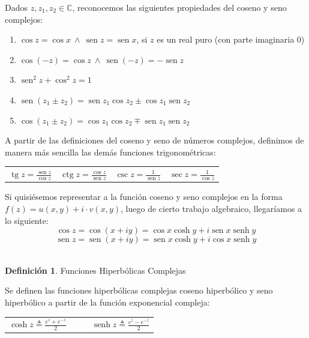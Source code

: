 \documentclass[12pt]{article}
\theoremstyle{definition}
\newtheorem{definition}{Definici\'on}[section]
\theoremstyle{theorem}
\DeclareMathOperator{\sen}{sen}
\DeclareMathOperator{\senh}{senh}
\DeclareMathOperator{\tg}{tg}
\DeclareMathOperator{\ctg}{ctg}
\begin{document}
Dados $z, z_1, z_2 \in \mathbb{C}$, reconocemos las siguientes propiedades del coseno y seno complejos:
\begin{enumerate}
	\item $\cos z = \cos x\ \land\ \sen z = \sen x$, si $z$ es un real puro (con parte imaginaria 0)
	\item $\cos(-z) = \cos {z}\ \land\ \sen(-z) = -\sen z$
	\item $\sen^2 z + \cos^2 z = 1$
	\item $\sen(z_1 \pm z_2) = \sen z_1 \cos z_2 \pm \cos z_1 \sen z_2$
	\item $\cos(z_1 \pm z_2) = \cos z_1 \cos z_2 \mp \sen z_1 \sen z_2$
\end{enumerate}

A partir de las definiciones del coseno y seno de n\'umeros complejos, definimos de manera m\'as sencilla las dem\'as funciones trigonom\'etricas:

\begin{center}
	\begin{tabular}{cccc}
	$\displaystyle \tg z = \frac{\sen z}{\cos z} $ & $\displaystyle \ctg z = \frac{\cos z}{\sen z} $ & $\displaystyle \csc z = \frac{1}{\sen z} $ & $\displaystyle \sec z = \frac{1}{\cos z} $ \\
	\end{tabular}
\end{center}

Si quisi\'esemos representar a la funci\'on coseno y seno complejos en la forma $f(z) = u(x, y) + i\cdot v(x, y)$, luego de cierto trabajo algebraico, llegar\'iamos a lo siguiente:
$$\cos z = \cos(x + iy) = \cos x \cosh y + i\sen x \senh y$$
$$\sen z = \sen(x + iy) = \sen x \cosh y + i\cos x \senh y$$\\

\colorbox{red!40!white!80}{\parbox{\linewidth}{
\theoremstyle{definition}
\begin{definition}{Funciones Hiperb\'olicas Complejas}

Se definen las funciones hiperb\'olicas complejas coseno hiperb\'olico y seno hiperb\'olico a partir de la funci\'on exponencial compleja:
\begin{center}
	\begin{tabular}{ccc}
		$\displaystyle \cosh z \triangleq \frac{e^{z} + e^{-z}}{2} $ &\ \ & $\displaystyle \senh z \triangleq \frac{e^{z} - e^{-z}}{2} $\\
	\end{tabular}
\end{center}
\end{definition}
}}
\linebreak
\linebreak
\end{document}
